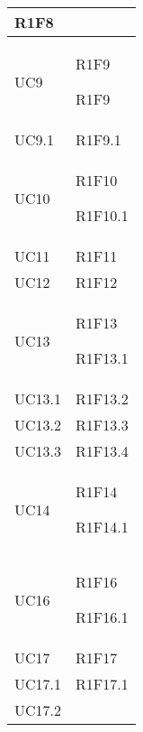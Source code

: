 \begin{center}
\begin{longtable}{|p{44mm}|p{22mm}|}
R1F8 \newline
\\
\hline
UC9 &

R1F9 \newline

R1F9 \newline
\\
\hline
UC9.1 &

R1F9.1 \newline
\\
\hline
UC10 &

R1F10 \newline

R1F10.1 \newline
\\
\hline
UC11 &

R1F11 \newline
\\
\hline
UC12 &

R1F12 \newline
\\
\hline
UC13 &

R1F13 \newline

R1F13.1 \newline
\\
\hline
UC13.1 &

R1F13.2 \newline
\\
\hline
UC13.2 &

R1F13.3 \newline
\\
\hline
UC13.3 &

R1F13.4 \newline
\\
\hline
UC14 &

R1F14 \newline

R1F14.1 \newline
\\
\hline
UC16 &

R1F16 \newline

R1F16.1 \newline
\\
\hline
UC17 &

R1F17 \newline
\\
\hline
UC17.1 &

R1F17.1 \newline
\\
\hline
UC17.2 &


\end{longtable}
\end{center}
